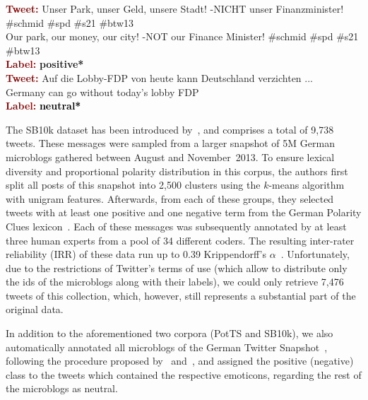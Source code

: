 \begin{example}\label{snt:cgsa:exmp:anno2}
  \noindent\textup{\bfseries\textcolor{darkred}{Tweet:}} {\upshape Unser Park, unser Geld, unsere Stadt! -NICHT unser Finanzminister! \smiley{} \#schmid \#spd \#s21 \#btw13}\\
  \noindent Our park, our money, our city! -NOT our Finance Minister! \smiley{} \#schmid \#spd \#s21 \#btw13\\
  \noindent\textup{\bfseries\textcolor{darkred}{Label:}}\hspace*{2em}\textbf{%
    \upshape\textcolor{green3}{positive*}}\\[1.5em]
  \noindent\textup{\bfseries\textcolor{darkred}{Tweet:}} {\upshape Auf die Lobby-FDP von heute kann Deutschland verzichten ...}\\
  \noindent Germany can go without today's lobby FDP\\
  \noindent\textup{\bfseries\textcolor{darkred}{Label:}}\hspace*{2em}\textbf{%
    \upshape\textcolor{black}{neutral*}}
\end{example}

The SB10k dataset has been introduced by~\citet{Cieliebak:17}, and
comprises a total of 9,738 tweets.  These messages were sampled from a
larger snapshot of 5M German microblogs gathered between August and
November~2013.  To ensure lexical diversity and proportional polarity
distribution in this corpus, the authors first split all posts of this
snapshot into 2,500 clusters using the $k$-means algorithm with
unigram features.  Afterwards, from each of these groups, they
selected tweets with at least one positive and one negative term from
the German Polarity Clues lexicon~\cite{Waltinger:10}.  Each of these
messages was subsequently annotated by at least three human experts
from a pool of 34 different coders.  The resulting inter-rater
reliability (IRR) of these data run up to 0.39 Krippendorff's
$\alpha$~\cite{Krippendorff:07}.  Unfortunately, due to the
restrictions of Twitter's terms of use (which allow to distribute only
the ids of the microblogs along with their labels), we could only
retrieve 7,476 tweets of this collection, which, however, still
represents a substantial part of the original data.

In addition to the aforementioned two corpora (PotTS and SB10k), we
also automatically annotated all microblogs of the German Twitter
Snapshot~\cite{Scheffler:14}, following the procedure proposed
by~\citet{Read:05} and~\citet{Go:09}, and assigned the positive
(negative) class to the tweets which contained the respective
emoticons, regarding the rest of the microblogs as neutral. %

